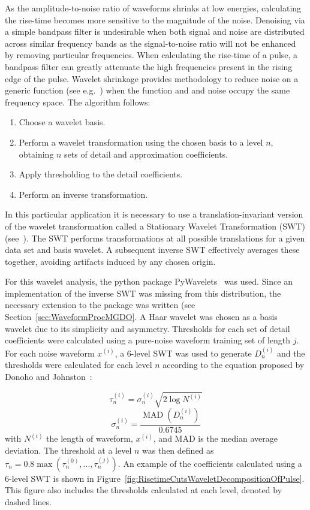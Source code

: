	As the amplitude-to-noise ratio of waveforms shrinks at low energies, calculating the rise-time becomes more sensitive to the magnitude of the noise.   Denoising via a simple bandpass filter is undesirable when both signal and noise are distributed across similar frequency bands as the signal-to-noise ratio will not be enhanced by removing particular frequencies.  When calculating the rise-time of a pulse, a bandpass filter can greatly attenuate the high frequencies present in the rising edge of the pulse.  Wavelet shrinkage provides methodology to reduce noise on a generic function (see e.g.~\cite{Don95aa,Don95bb}) when the function and and noise occupy the same frequency space.  The algorithm follows:
				\begin{enumerate}
					\item Choose a wavelet basis.
					\item Perform a wavelet transformation using the chosen basis to a level $n$, 
					obtaining $n$ sets of detail and approximation coefficients.
					\item Apply thresholding to the detail coefficients.
					\item Perform an inverse transformation.
				\end{enumerate}
	In this particular application it is necessary to use a translation-invariant version of the wavelet transformation called a Stationary Wavelet Transformation (SWT) (see~\cite{Coif95aa,Naso95aa}).  The SWT performs transformations at all possible translations for a given data set and basis wavelet.  A subsequent inverse SWT effectively averages these together, avoiding artifacts induced by any chosen origin.  
	
	For this wavelet analysis, the python package PyWavelets~\cite{PyWave} was used.  Since an implementation of the inverse SWT was missing from this distribution, the necessary extension to the package was written (see Section~\ref{sec:WaveformProcMGDO}.  A Haar wavelet was chosen as a basis wavelet due to its simplicity and asymmetry.  Thresholds for each set of detail coefficients were calculated using a pure-noise waveform training set of length $j$.  For each noise waveform $x^{(i)}$, a 6-level SWT was used to generate $D_{n}^{(i)}$ and the thresholds were calculated for each level $n$ according to the equation proposed by Donoho and Johnston~\cite{Don95ad}:
	
				\begin{equation}			
					\tau_{n}^{(i)} = \sigma_{n}^{(i)} \sqrt{2 \log N^{(i)}}
				\end{equation}			
				\[
					\sigma_{n}^{(i)} = \frac{\operatorname{MAD}\left(D_{n}^{(i)}\right)}{0.6745}
				\]
with $N^{(i)}$ the length of waveform, $x^{(i)}$, and MAD is the median average deviation.  The threshold at a level $n$ was then defined as $\tau_{n} = 0.8 \max(\tau_{n}^{(0)},...,\tau_{n}^{(j)})$.  An example of the coefficients calculated using a 6-level SWT is shown in Figure~\ref{fig:RisetimeCutsWaveletDecompositionOfPulse}.  This figure also includes the thresholds calculated at each level, denoted by dashed lines.  

